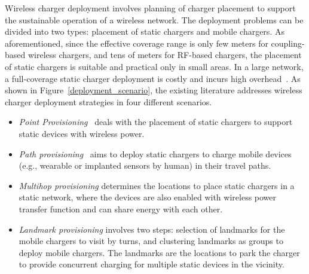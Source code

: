 \documentclass[twocolumn,10pt]{IEEEtran}
\begin{document}
Wireless charger deployment involves planning of charger placement to support the sustainable operation of a wireless network. The deployment problems can be divided into two types: placement of static chargers and mobile chargers. As aforementioned, since the effective coverage range is only few meters for coupling-based wireless chargers, and tens of meters for RF-based chargers, the placement of static chargers is suitable and practical only in small areas. In a large network, a full-coverage static charger deployment is costly and incurs high overhead~\cite{C2012Chiu}. As shown in Figure~\ref{deployment_scenario}, the existing literature addresses wireless charger deployment strategies in four different scenarios.
\begin{itemize}
\item \emph{Point Provisioning}~\cite{S2013He} deals with the placement of static chargers to support static devices with wireless power.   

\item \emph{Path provisioning}~\cite{S2013He} aims to deploy static chargers to charge mobile devices (e.g., wearable or implanted sensors by human) in their travel paths.

\item \emph{Multihop provisioning} determines the locations to place static chargers in a static network, where the devices are also enabled with wireless power transfer function and can share energy with each other.

\item \emph{Landmark provisioning} involves two steps: selection of landmarks for the mobile chargers to visit by turns, and clustering landmarks as groups to deploy mobile chargers. The landmarks are the locations to park the charger to provide concurrent charging for multiple static devices in the vicinity.
\end{itemize}  

\begin{figure*} 
\centering
{}  
 \centering
  \centering
  \centering  
 \\
\centering
\caption{Reference models of wireless charger deployment scenario.} 
\label{deployment_scenario}
\end{figure*}
\end{document}
